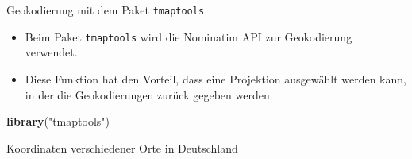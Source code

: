 \documentclass[ignorenonframetext,]{beamer}
\newenvironment{Shaded}{\begin{snugshade}}{\end{snugshade}}
\newcommand{\ControlFlowTok}[1]{\textcolor[rgb]{0.13,0.29,0.53}{\textbf{#1}}}
\newcommand{\DecValTok}[1]{\textcolor[rgb]{0.00,0.00,0.81}{#1}}
\newcommand{\KeywordTok}[1]{\textcolor[rgb]{0.13,0.29,0.53}{\textbf{#1}}}
\newcommand{\NormalTok}[1]{#1}
\newcommand{\OperatorTok}[1]{\textcolor[rgb]{0.81,0.36,0.00}{\textbf{#1}}}
\newcommand{\StringTok}[1]{\textcolor[rgb]{0.31,0.60,0.02}{#1}}
\providecommand{\tightlist}{%
  \setlength{\itemsep}{0pt}\setlength{\parskip}{0pt}}
\begin{document}
\begin{frame}[fragile]{Geokodierung mit dem Paket \texttt{tmaptools}}
\protect\hypertarget{geokodierung-mit-dem-paket-tmaptools}{}

\begin{itemize}
\tightlist
\item
  Beim Paket \texttt{tmaptools} wird die Nominatim API zur Geokodierung
  verwendet.
\item
  Diese Funktion hat den Vorteil, dass eine Projektion ausgewählt werden
  kann, in der die Geokodierungen zurück gegeben werden.
\end{itemize}

\begin{Shaded}
\begin{Highlighting}[]
\KeywordTok{library}\NormalTok{(}\StringTok{"tmaptools"}\NormalTok{)}
\end{Highlighting}
\end{Shaded}

\end{frame}

\begin{frame}[fragile]{Koordinaten verschiedener Orte in Deutschland}
\protect\hypertarget{koordinaten-verschiedener-orte-in-deutschland}{}

\begin{Shaded}
\end{Shaded}

\end{frame}
\end{document}
